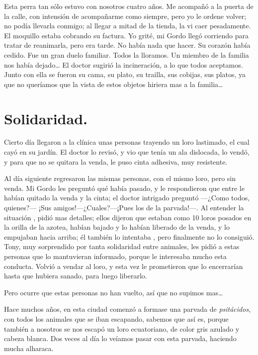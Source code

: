 \documentclass[letterpaper, 12pt]{book}
\begin{document}
Esta perra tan sólo estuvo con nosotros cuatro años. Me acompañó a la puerta de la calle, con intensión de acompañarme como siempre, pero yo le ordene volver; no podía llevarla conmigo; al llegar a mitad de la tienda, la vi caer pesadamente. El moquillo estaba cobrando su factura. Yo grité, mi Gordo llegó corriendo para tratar de reanimarla, pero era tarde. No había nada que hacer. Su corazón había cedido. Fue un gran duelo familiar. Todos la lloramos. Un miembro de la familia nos había dejado\ldots
El doctor sugirió la incineración, a lo que todos aceptamos. Junto con ella se fueron su cama, su plato, su trailla, sus cobijas, sus platos, ya que no queríamos que la vista de estos objetos hiriera mas a la familia\ldots


\chapter{Solidaridad.}

Cierto día llegaron a la clínica unas personas trayendo un loro lastimado, el cual cayó en su jardín. El doctor lo revisó, y vio que tenía un ala dislocada, lo vendó, y para que no se quitara la venda, le puso cinta adhesiva, muy resistente. 

Al día siguiente regresaron las mismas personas, con el mismo loro, pero sin venda. Mi Gordo les preguntó qué había pasado, y le respondieron que entre le habían quitado la venda y la cinta; el doctor intrigado preguntó ---¿Como todos, quienes?---
¡Sus amigos!---¿Cuales?---¡Pues los de la parvada!---. Al entender la situación , pidió mas detalles; ellos dijeron que estaban como 10 loros posados en la orilla de la azotea, habían bajado y lo habían liberado de la venda, y lo empujaban hacia arriba; él también lo intentaba , pero finalmente no lo consiguió. Tony, muy sorprendido por tanta solidaridad entre animales, les pidió a estas personas que lo mantuvieran informado, porque le interesaba mucho esta conducta. Volvió a vendar al loro, y esta vez le prometieron que lo encerrarían hasta que hubiera sanado, para luego liberarlo.

Pero ocurre que estas personas no han vuelto, así que no supimos mas\ldots

Hace muchos años, en esta ciudad comenzó a formase una parvada de {\it psitácidos}, con todos los animales que se iban escapando, sabemos que así es, porque también a nosotros se nos escapó un loro ecuatoriano, de color gris azulado y cabeza blanca. Dos veces al día lo veíamos pasar con esta parvada, haciendo mucha alharaca. 
\end{document}

